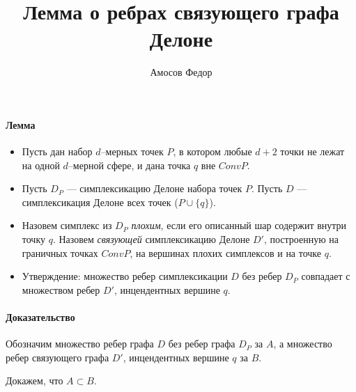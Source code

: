 \documentclass{article}
\title{\bf Лемма о ребрах связующего графа Делоне}
\author{Амосов Федор}
\begin{document}
	\maketitle

    \paragraph{Лемма\\}
        \begin{itemize}
            \item Пусть дан набор $d$--мерных точек $P$, в котором любые $d + 2$ точки не лежат на одной $d$--мерной сфере, и дана точка $q$ вне $Conv P$.
            \item Пусть $D_P$ --- симплексикацию Делоне набора точек $P$. Пусть $D$ --- симплексикация Делоне всех точек ($P \cup \{q\}$).
            \item Назовем симплекс из $D_P$ {\it плохим}, если его описанный шар содержит внутри точку $q$. Назовем {\it связующей} симплексикацию Делоне $D'$, построенную на граничных точках $Conv P$, на вершинах плохих симплексов и на точке $q$. 
            \item Утверждение: множество ребер симплексикации $D$ без ребер $D_P$ совпадает с множеством ребер $D'$, инцендентных вершине $q$.
        \end{itemize}
        
    \paragraph{Доказательство\\}
        Обозначим множество ребер графа $D$ без ребер графа $D_P$ за $A$, а множество ребер связующего графа $D'$, инцендентных вершине $q$ за $B$.
        
        Докажем, что $A \subset B$.        
        
        
\end{document}
